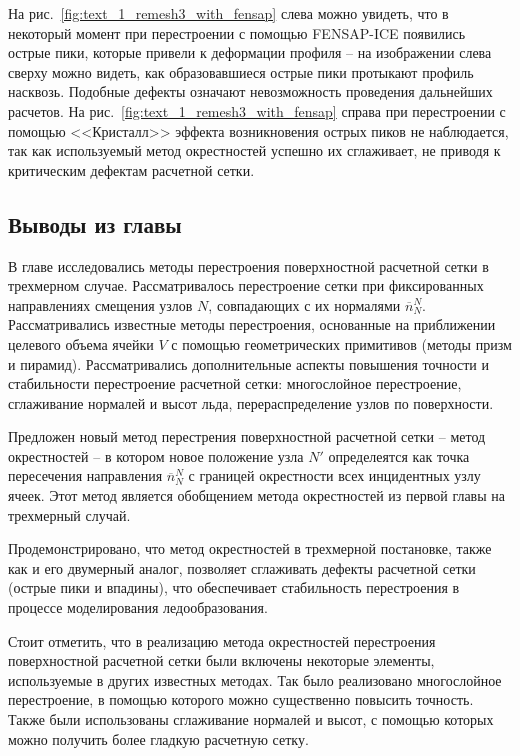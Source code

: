 На рис.~\ref{fig:text_1_remesh3_with_fensap} слева можно увидеть, что в некоторый момент при перестроении с помощью FENSAP-ICE появились острые пики, которые привели к деформации профиля -- на изображении слева сверху можно видеть, как образовавшиеся острые пики протыкают профиль насквозь.
Подобные дефекты означают невозможность проведения дальнейших расчетов.
На рис.~\ref{fig:text_1_remesh3_with_fensap} справа при перестроении с помощью <<Кристалл>> эффекта возникновения острых пиков не наблюдается, так как используемый метод окрестностей успешно их сглаживает, не приводя к критическим дефектам расчетной сетки.


\subsection{Выводы из главы}

В главе исследовались методы перестроения поверхностной расчетной сетки в трехмерном случае.
Рассматривалось перестроение сетки при фиксированных направлениях смещения узлов $N$, совпадающих с их нормалями $\overline{n}_{N}^N$.
Рассматривались известные методы перестроения, основанные на приближении целевого объема ячейки $V$ с помощью геометрических примитивов (методы призм и пирамид).
Рассматривались дополнительные аспекты повышения точности и стабильности перестроение расчетной сетки: многослойное перестроение, сглаживание нормалей и высот льда, перераспределение узлов по поверхности.

Предложен новый метод перестрения поверхностной расчетной сетки -- метод окрестностей -- в котором новое положение узла $N'$ определеятся как точка пересечения направления $\overline{n}_{N}^N$ с границей окрестности всех инцидентных узлу ячеек.
Этот метод является обобщением метода окрестностей из первой главы на трехмерный случай.

Продемонстрировано, что метод окрестностей в трехмерной постановке, также как и его двумерный аналог, позволяет сглаживать дефекты расчетной сетки (острые пики и впадины), что обеспечивает стабильность перестроения в процессе моделирования ледообразования.

Стоит отметить, что в реализацию метода окрестностей перестроения поверхностной расчетной сетки были включены некоторые элементы, используемые в других известных методах.
Так было реализовано многослойное перестроение, в помощью которого можно существенно повысить точность.
Также были использованы сглаживание нормалей и высот, с помощью которых можно получить более гладкую расчетную сетку.

